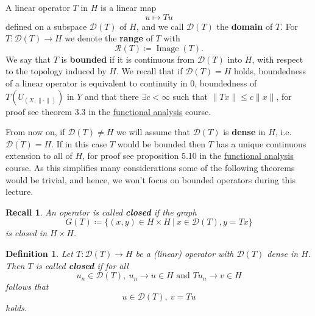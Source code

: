 \documentclass[12pt]{extreport} %
\newcommand{\DO}[1]{\mathcal{D}\left( {#1} \right)}
\newcommand{\RO}[1]{\mathcal{R}\left( {#1} \right)}
\theoremstyle{named}
\theoremstyle{nnamed}
\theoremstyle{itshape}
\newtheorem{definition}{Definition}  \counterwithin{definition}{chapter}
\theoremstyle{normal}
\newtheorem*{recall}{Recall}
\begin{document}
 
A linear operator $T$ in $H$ is a linear map 
	$$ u \mapsto Tu $$
defined on a subspace $\DO{T}$ of $H$, and we call $\DO{T}$ the \textbf{domain} of $T$. For $T \colon \DO{T} \rightarrow H$ we denote the \textbf{range} of $T$ with
$$ \RO{T} \coloneqq \operatorname{Image}\left( T \right). $$
\newpage
{} 
We say that $T$ is \textbf{bounded} if it is continuous from $\DO{T}$ into $H$, with respect to the topology induced by $H$. We recall that if $\DO{T} = H$ holds, boundedness of a linear operator is equivalent to continuity in $0$, boundedness of $T(U_{(X,\|\cdot\|)})$ in $Y$ and that there $\exists c < \infty$ such that $\| T x \| \leq c \| x \|$, for proof see theorem 3.3 in the \href{https://github.com/MBelica/Funktionalanalysis-WS2015}{functional analysis} course. ~\bigskip

 From now on, if $\DO{T} \neq H$ we will assume that $\DO{T}$ is \textbf{dense} in $H$, i.e. $\overline{\DO{T}} = H$. If in this case $T$ would be bounded then $T$ has a unique continuous extension to all of $H$, for proof see proposition 5.10 in the \href{https://github.com/MBelica/Funktionalanalysis-WS2015}{functional analysis} course.  As this simplifies many considerations some of the following theorems would be trivial, and hence, we won't focus on bounded operators during this lecture.

\begin{recall}   
	An operator is called \textbf{closed} if the graph 
	$$ G(T) \coloneqq \big\{ (x, y) \in H \times H ~ \big| ~ x \in \DO{T}, y = Tx \big\} $$
	is closed in $H \times H$.
\end{recall}

 
\begin{definition} \label{i.1:def}
	Let $T \colon \DO{T} \rightarrow H$ be a (linear) operator with $\DO{T}$ dense in $H$. Then $T$ is called \textbf{closed} if for all 
		$$ u_n \in \DO{T}, ~ u_n \rightarrow u \in H \text{ and } T u_n \rightarrow v \in H $$
	follows that
		$$ u \in \DO{T}, ~ v = T u $$
	holds.
\end{definition}
\end{document}
